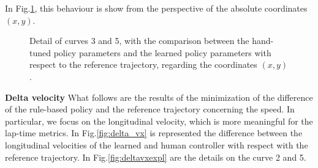 In Fig.\ref{fig:curvespos}, this behaviour is show from the perspective of the absolute coordinates $(x,y)$.




\begin{figure}[H]
\centering
{}
\hspace{2mm}
\caption{Detail of curves 3 and 5, with the comparison between the hand-tuned policy parameters and the learned policy parameters with respect to the reference trajectory, regarding the coordinates $(x,y)$.}
\label{fig:curvespos}
\end{figure}





\textbf{Delta velocity}
What follows are the results of the minimization of the difference of the rule-based policy and the reference trajectory concerning the speed. In particular, we focus on the longitudinal velocity, which is more meaningful for the lap-time metrics.
In Fig.\ref{fig:delta_vx} is represented the difference between the longitudinal velocities of the learned and human controller with respect with the reference trajectory. In Fig.\ref{fig:deltavxexpl} are the details on the curve 2 and 5.



